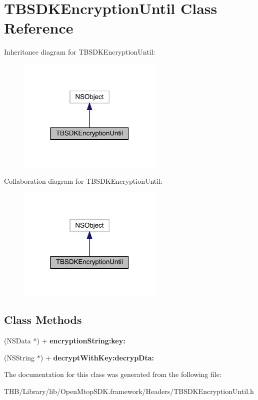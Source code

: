 \hypertarget{interface_t_b_s_d_k_encryption_until}{}\section{T\+B\+S\+D\+K\+Encryption\+Until Class Reference}
\label{interface_t_b_s_d_k_encryption_until}


Inheritance diagram for T\+B\+S\+D\+K\+Encryption\+Until\+:\nopagebreak
\begin{figure}[H]
\begin{center}
\leavevmode
\includegraphics[width=197pt]{interface_t_b_s_d_k_encryption_until__inherit__graph}
\end{center}
\end{figure}


Collaboration diagram for T\+B\+S\+D\+K\+Encryption\+Until\+:\nopagebreak
\begin{figure}[H]
\begin{center}
\leavevmode
\includegraphics[width=197pt]{interface_t_b_s_d_k_encryption_until__coll__graph}
\end{center}
\end{figure}
\subsection*{Class Methods}
\begin{DoxyCompactItemize}
\item 
\mbox{\label{interface_t_b_s_d_k_encryption_until_ad968e1ca58027bcd6f1950b0fab1dc80}} 
(N\+S\+Data $\ast$) + {\bfseries encryption\+String\+:key\+:}
\item 
\mbox{\label{interface_t_b_s_d_k_encryption_until_acfa7631a7d7a9fce95cc7686570cf6a0}} 
(N\+S\+String $\ast$) + {\bfseries decrypt\+With\+Key\+:decryp\+Dta\+:}
\end{DoxyCompactItemize}


The documentation for this class was generated from the following file\+:\begin{DoxyCompactItemize}
\item 
T\+H\+B/\+Library/lib/\+Open\+Mtop\+S\+D\+K.\+framework/\+Headers/T\+B\+S\+D\+K\+Encryption\+Until.\+h\end{DoxyCompactItemize}
